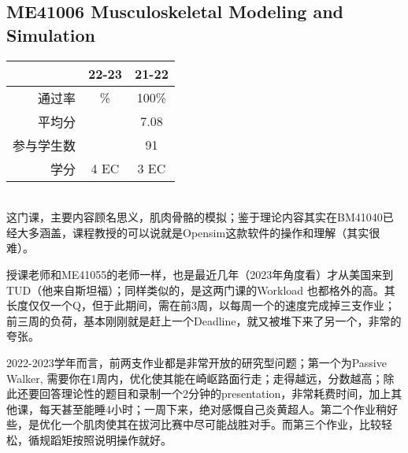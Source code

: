 \subsection{ME41006 Musculoskeletal Modeling and Simulation}\hypertarget{ME41006}{} 
\begin{minipage}{0.45\textwidth}
\centering
{}
\end{minipage}%
\begin{minipage}{0.45\textwidth}
\raggedleft
\begin{tabular}{r|c|c}
\textbf{ } & \textbf{22-23} & \textbf{21-22}\\ \hline
通过率 & \% & 100\%\\ 
平均分 &   & 7.08\\ 
参与学生数 &  & 91\\
学分 & 4 EC & 3 EC\\
\end{tabular}
\end{minipage}\\

这门课，主要内容顾名思义，肌肉骨骼的模拟；鉴于理论内容其实在BM41040已经大多涵盖，课程教授的可以说就是Opensim这款软件的操作和理解（其实很难）。

授课老师和ME41055的老师一样，也是最近几年（2023年角度看）才从美国来到TUD（他来自斯坦福）；同样类似的，是这两门课的Workload 也都格外的高。其长度仅仅一个Q，但于此期间，需在前3周，以每周一个的速度完成掉三支作业；前三周的负荷，基本刚刚就是赶上一个Deadline，就又被堆下来了另一个，非常的夸张。

2022-2023学年而言，前两支作业都是非常开放的研究型问题；第一个为Passive Walker, 需要你在1周内，优化使其能在崎岖路面行走；走得越远，分数越高；除此还要回答理论性的题目和录制一个2分钟的presentation，非常耗费时间，加上其他课，每天甚至能睡4小时；一周下来，绝对感慨自己炎黄超人。第二个作业稍好些，是优化一个肌肉使其在拔河比赛中尽可能战胜对手。而第三个作业，比较轻松，循规蹈矩按照说明操作就好。

